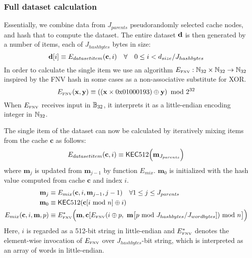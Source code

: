 \subsubsection{Full dataset calculation} \label{app:dataset}
Essentially, we combine data from $J_{parents}$ pseudorandomly selected cache nodes, and hash that to compute the dataset. The entire dataset $\mathbf{d}$ is then generated by a number of items, each of $J_{hashbytes}$ bytes in size:
\begin{equation}
\mathbf{d}[i] \equiv E_{datasetitem}(\mathbf{c}, i) \quad \forall \quad 0\le i < d_{size}/J_{hashbytes} 
\end{equation}
In order to calculate the single item we use an algorithm $E_\text{\tiny FNV}:\mathbb{N}_{32}\times\mathbb{N}_{32} \to \mathbb{N}_{32}$ inspired by the FNV hash \cite{FowlerNollVo1991FNVHash} in some cases as a non-associative substitute for XOR.
\begin{equation}
	E_\text{\tiny FNV}(\mathbf{x}, \mathbf{y}) \equiv \left( (\mathbf{x} \times \mathrm{0x01000193}) \oplus \mathbf{y}\right) \mbox{ mod } 2^{32}
\end{equation}
When $E_\text{\tiny FNV}$ receives input in $\mathbb{B}_{32}$, it interprets it as a little-endian encoding integer in $\mathbb{N}_{32}$.

The single item of the dataset can now be calculated by iteratively mixing items from the cache $\mathbf{c}$ as follows:
\begin{equation}
 E_{datasetitem}(\mathbf{c}, i) \equiv 
 \mathsf{KEC}512\Big(\mathbf{m}_{J_{parents}}\Big)
\end{equation}
where $\mathbf{m}_{j}$ is updated from $\mathbf{m}_{j-1}$ by function $E_{mix}$. $\mathbf{m}_0$ is initialized with the hash value computed from cache $\mathbf{c}$ and index $i$.
\begin{align}
	\mathbf{m}_j &\equiv E_{mix}(\mathbf{c}, i, \mathbf{m}_{j-1},j-1) \quad \forall 1\le j \le J_{parents} \\
	\mathbf{m}_0 &\equiv \mathsf{KEC}512(\mathbf{c}[i\mbox{ mod } n] \oplus i) \\
	E_{mix}(\mathbf{c}, i, \mathbf{m},p) & \equiv E_\text{\tiny FNV}^*\Big(\mathbf{m}, \mathbf{c}[E_\text{\tiny FNV}(i \oplus p, ~ \mathbf{m}\big[p \mbox{ mod } J_{hashbytes} / J_{wordbytes} ]) \mbox{ mod } n \big] \Big)
\end{align}
Here, $i$ is regarded as a 512-bit string in little-endian
and $E_\text{\tiny FNV}^*$ denotes the element-wise invocation of $E_\text{\tiny FNV}$ over $J_{hashbytes}$-bit string, which is interpreted as an array of words in little-endian. 

